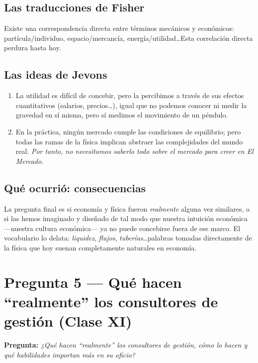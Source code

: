 \documentclass[a4paper,12pt]{article}
\begin{document}
\subsection*{Las traducciones de Fisher}

Existe una correspondencia directa entre términos mecánicos y económicos: partícula/individuo, espacio/mercancía, energía/utilidad\ldots Esta correlación directa perdura hasta hoy.

\subsection*{Las ideas de Jevons}

\begin{enumerate}
  \item La utilidad es difícil de concebir, pero la percibimos a través de sus efectos cuantitativos (salarios, precios\ldots), igual que no podemos conocer ni medir la gravedad en sí misma, pero sí medimos el movimiento de un péndulo.
  \item En la práctica, ningún mercado cumple las condiciones de equilibrio; pero todas las ramas de la física implican abstraer las complejidades del mundo real. \textit{Por tanto, no necesitamos saberlo todo sobre el mercado para creer en El Mercado.}
\end{enumerate}

\subsection*{Qué ocurrió: consecuencias}

La pregunta final es si economía y física fueron \textit{realmente} alguna vez similares, o si las hemos imaginado y diseñado de tal modo que nuestra intuición económica ---nuestra cultura económica--- ya no puede concebirse fuera de ese marco. El vocabulario lo delata: \textit{liquidez}, \textit{flujos}, \textit{tuberías}\ldots palabras tomadas directamente de la física que hoy suenan completamente naturales en economía.

\vspace{1.5em}

\section{Pregunta 5 — Qué hacen ``realmente'' los consultores de gestión (Clase XI)}

\textbf{Pregunta:} \textit{¿Qué hacen ``realmente'' los consultores de gestión, cómo lo hacen y qué habilidades importan más en su oficio?}
\end{document}
